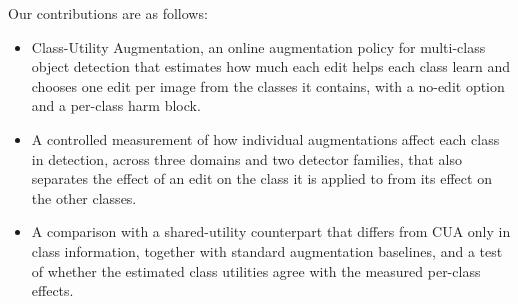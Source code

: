 Our contributions are as follows:
\begin{itemize}
    \item Class-Utility Augmentation, an online augmentation policy for multi-class object detection that estimates how much each edit helps each class learn and chooses one edit per image from the classes it contains, with a no-edit option and a per-class harm block.
    \item A controlled measurement of how individual augmentations affect each class in detection, across three domains and two detector families, that also separates the effect of an edit on the class it is applied to from its effect on the other classes.
    \item A comparison with a shared-utility counterpart that differs from CUA only in class information, together with standard augmentation baselines, and a test of whether the estimated class utilities agree with the measured per-class effects.
\end{itemize}

